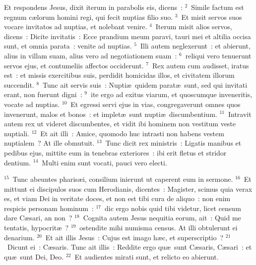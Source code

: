 \lettrine[lines=10,image=true,loversize=0.05,lraise=-0.03]{E}{}t respondens Jesus, dixit iterum in parabolis eis, dicens~:
${}^{2}$~Simile factum est regnum c\ae lorum homini regi, qui fecit nuptias filio suo.
${}^{3}$~Et misit servos suos vocare invitatos ad nuptias, et nolebant venire.
${}^{4}$~Iterum misit alios servos, dicens~: Dicite invitatis~: Ecce prandium meum paravi, tauri mei et altilia occisa sunt, et omnia parata~: venite ad nuptias.
${}^{5}$~Illi autem neglexerunt~: et abierunt, alius in villam suam, alius vero ad negotiationem suam~:
${}^{6}$~reliqui vero tenuerunt servos ejus, et contumeliis affectos occiderunt.
${}^{7}$~Rex autem cum audisset, iratus est~: et missis exercitibus suis, perdidit homicidas illos, et civitatem illorum succendit.
${}^{8}$~Tunc ait servis suis~: Nupti\ae\ quidem parat\ae\ sunt, sed qui invitati erant, non fuerunt digni~:
${}^{9}$~ite ergo ad exitus viarum, et quoscumque inveneritis, vocate ad nuptias.
${}^{10}$~Et egressi servi ejus in vias, congregaverunt omnes quos invenerunt, malos et bonos~: et implet\ae\ sunt nupti\ae\ discumbentium.
${}^{11}$~Intravit autem rex ut videret discumbentes, et vidit ibi hominem non vestitum veste nuptiali.
${}^{12}$~Et ait illi~: Amice, quomodo huc intrasti non habens vestem nuptialem~? At ille obmutuit.
${}^{13}$~Tunc dicit rex ministris~: Ligatis manibus et pedibus ejus, mittite eum in tenebras exteriores~: ibi erit fletus et stridor dentium.
${}^{14}$~Multi enim sunt vocati, pauci vero electi.


${}^{15}$~Tunc abeuntes pharis\ae i, consilium inierunt ut caperent eum in sermone.
${}^{16}$~Et mittunt ei discipulos suos cum Herodianis, dicentes~: Magister, scimus quia verax es, et viam Dei in veritate doces, et non est tibi cura de aliquo~: non enim respicis personam hominum~:
${}^{17}$~dic ergo nobis quid tibi videtur, licet censum dare C\ae sari, an non~?
${}^{18}$~Cognita autem Jesus nequitia eorum, ait~: Quid me tentatis, hypocrit\ae~?
${}^{19}$~ostendite mihi numisma census. At illi obtulerunt ei denarium.
${}^{20}$~Et ait illis Jesus~: Cujus est imago h\ae c, et superscriptio~?
${}^{21}$~Dicunt ei~: C\ae saris. Tunc ait illis~: Reddite ergo qu\ae\ sunt C\ae saris, C\ae sari~: et qu\ae\ sunt Dei, Deo.
${}^{22}$~Et audientes mirati sunt, et relicto eo abierunt.


